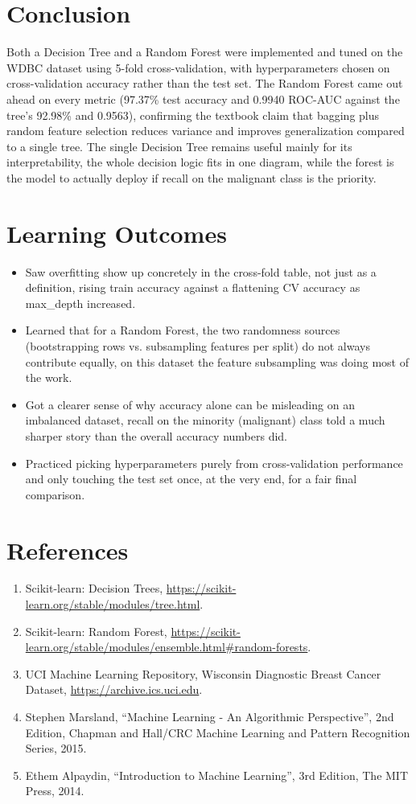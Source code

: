 \documentclass[12pt,a4paper]{article}
\begin{document}
\section{Conclusion}
Both a Decision Tree and a Random Forest were implemented and tuned on the WDBC dataset using 5-fold
cross-validation, with hyperparameters chosen on cross-validation accuracy rather than the test set.
The Random Forest came out ahead on every metric (97.37\% test accuracy and 0.9940 ROC-AUC against the
tree's 92.98\% and 0.9563), confirming the textbook claim that bagging plus random feature selection
reduces variance and improves generalization compared to a single tree. The single Decision Tree
remains useful mainly for its interpretability, the whole decision logic fits in one diagram, while
the forest is the model to actually deploy if recall on the malignant class is the priority.

\section{Learning Outcomes}
\begin{itemize}
\item Saw overfitting show up concretely in the cross-fold table, not just as a definition, rising
train accuracy against a flattening CV accuracy as max\_depth increased.
\item Learned that for a Random Forest, the two randomness sources (bootstrapping rows vs.
subsampling features per split) do not always contribute equally, on this dataset the feature
subsampling was doing most of the work.
\item Got a clearer sense of why accuracy alone can be misleading on an imbalanced dataset, recall on
the minority (malignant) class told a much sharper story than the overall accuracy numbers did.
\item Practiced picking hyperparameters purely from cross-validation performance and only touching
the test set once, at the very end, for a fair final comparison.
\end{itemize}

\section{References}
\begin{enumerate}
\item Scikit-learn: Decision Trees, \url{https://scikit-learn.org/stable/modules/tree.html}.
\item Scikit-learn: Random Forest, \url{https://scikit-learn.org/stable/modules/ensemble.html\#random-forests}.
\item UCI Machine Learning Repository, Wisconsin Diagnostic Breast Cancer Dataset,
\url{https://archive.ics.uci.edu}.
\item Stephen Marsland, ``Machine Learning - An Algorithmic Perspective'', 2nd Edition, Chapman and
Hall/CRC Machine Learning and Pattern Recognition Series, 2015.
\item Ethem Alpaydin, ``Introduction to Machine Learning'', 3rd Edition, The MIT Press, 2014.
\end{enumerate}
\end{document}
